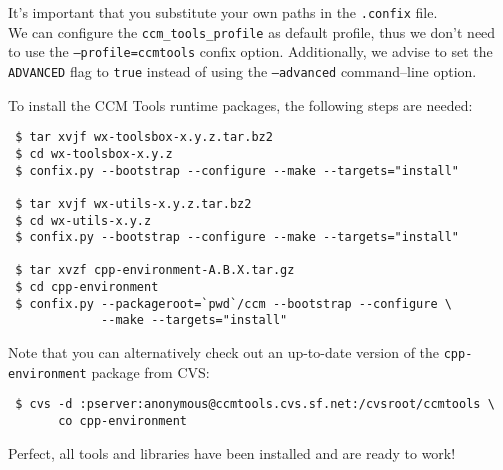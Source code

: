 \noindent
It's important that you substitute your own paths in the {\tt .confix} file.\\
We can configure the {\tt ccm\_tools\_profile} as default profile, thus we 
don't need to use the {\tt --profile=ccmtools} confix option.
Additionally, we advise to set the {\tt ADVANCED} flag to {\tt true} instead of
using the {\tt --advanced} command--line option. 


\noindent
To install the CCM Tools runtime packages, the following steps are needed: 

\begin{small}
\begin{verbatim}
 $ tar xvjf wx-toolsbox-x.y.z.tar.bz2
 $ cd wx-toolsbox-x.y.z
 $ confix.py --bootstrap --configure --make --targets="install"

 $ tar xvjf wx-utils-x.y.z.tar.bz2
 $ cd wx-utils-x.y.z
 $ confix.py --bootstrap --configure --make --targets="install"

 $ tar xvzf cpp-environment-A.B.X.tar.gz
 $ cd cpp-environment
 $ confix.py --packageroot=`pwd`/ccm --bootstrap --configure \
             --make --targets="install"
\end{verbatim}
\end{small}

Note that you can alternatively check out an up-to-date version of the
{\tt cpp-environment} package from CVS:
\begin{small}
\begin{verbatim}
 $ cvs -d :pserver:anonymous@ccmtools.cvs.sf.net:/cvsroot/ccmtools \
       co cpp-environment
\end{verbatim}
\end{small}

Perfect, all tools and libraries have been installed and are ready to work!





